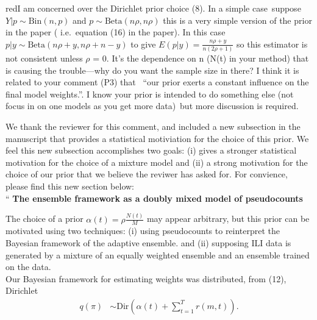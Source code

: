 \documentclass[
  fontsize=11pt,
  paper=a4,
  parskip=half,
  enlargefirstpage=on,    %
  fromalign=right,        %
  fromphone=on,           %
  fromrule=aftername,     %
  addrfield=on,           %
  backaddress=on,         %
  subject=beforeopening,  %
  locfield=narrow,        %
  foldmarks=on,           %
]{scrlttr2}
\def\l{\left}
\def\r{\right}
\begin{document}
    \begin{commt}{red}{I am concerned over the Dirichlet prior choice (8). In a simple case\, suppose {$Y|p \sim \text{Bin}(n, p)$} and {$p \sim \text{Beta}(n\rho , n\rho)$}  this is a very simple version of the prior in the paper ( i.e.\, equation (16) in the paper). In this case {$ p|y \sim \text{Beta}(n\rho+y , n\rho+ n - y) $} to give {$E(p|y) = \frac{n \rho + y}{n (2 \rho + 1)}$} so this estimator is not consistent unless {$\rho$ = 0}. It's the dependence on n (N(t) in your method) that is causing the trouble---why do you want the sample size in there? I think it is related to your comment (P3) that \, ``our prior exerts a constant influence on the final model weights.''. I know your prior is intended to do something else (not focus in on one models as you get more data)\, but more discussion is required. }

      We thank the reviewer for this comment, and included a new subsection in the manuscript that provides a statistical motiviation for the choice of this prior.
      We feel this new subsection accomplishes two goals: (i) gives a stronger statistical motivation for the choice of a mixture model and (ii) a strong motivation for the choice of our prior that we believe the reviwer has asked for.
      For convience, please find this new section below:\\

      ``
      \textbf{The ensemble framework as a doubly mixed model of pseudocounts}

The choice of a prior $\alpha(t) = \rho \frac{N(t)}{M}$ may appear arbitrary, but this prior can be motivated using two techniques: (i) using pseudocounts to reinterpret the Bayesian framework of the adaptive ensemble.  and (ii) supposing ILI data is generated by a mixture of an equally weighted ensemble and an ensemble trained on the data.\\

Our Bayesian framework for estimating weights was distributed, from (12), Dirichlet
\begin{align}
  q(\pi)  &\sim \mathrm{Dir}\l( \alpha(t) + \sum_{t=1}^{T}  r(m,t)  \r). \tag{18}\label{eq:18}
\end{align}


\end{commt}
\end{document}
